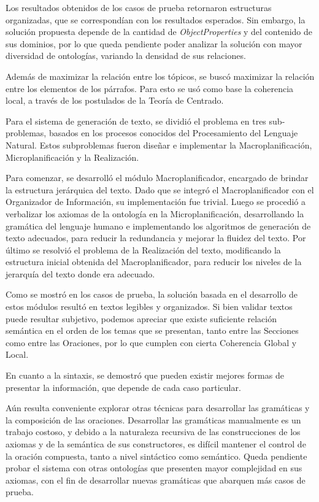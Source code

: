 Los resultados obtenidos de los casos de prueba retornaron estructuras organizadas, que se correspondían con los resultados esperados. Sin embargo, la solución propuesta depende de la cantidad de \emph{ObjectProperties} y del contenido de sus dominios, por lo que queda pendiente poder analizar la solución con mayor diversidad de ontologías, variando la densidad de sus relaciones.

Además de maximizar la relación entre los tópicos, se buscó maximizar la relación entre los elementos de los párrafos. Para esto se usó como base la coherencia local, a través de los postulados de la Teoría de Centrado.

Para el sistema de generación de texto, se dividió el problema en tres sub-problemas, basados en los procesos conocidos del Procesamiento del Lenguaje Natural. Estos subproblemas fueron diseñar e implementar la Macroplanificación, Microplanificación y la Realización. 

Para comenzar, se desarrolló el módulo Macroplanificador, encargado de brindar la estructura jerárquica del texto. Dado que se integró el Macroplanificador con el Organizador de Información, su implementación fue trivial.
Luego se procedió a verbalizar los axiomas de la ontología en la Microplanificación, desarrollando la gramática del lenguaje humano e implementando los algoritmos de generación de texto adecuados, para reducir la redundancia y mejorar la fluidez del texto.
Por  último  se  resolvió  el  problema  de  la  Realización  del  texto,  modificando  la  estructura inicial obtenida del Macroplanificador, para reducir los niveles de la jerarquía del texto donde era adecuado.

Como se mostró en los casos de prueba, la solución basada en el desarrollo de estos módulos resultó en textos legibles y organizados. Si bien validar textos puede resultar subjetivo, podemos apreciar que existe suficiente relación semántica en el orden de los temas que se presentan, tanto entre las Secciones como entre las Oraciones, por lo que cumplen con cierta Coherencia Global y Local.

En cuanto a la sintaxis, se demostró que pueden existir mejores formas de presentar la información, que depende de cada caso particular.

Aún resulta conveniente explorar otras técnicas para desarrollar las gramáticas y la composición de las oraciones. Desarrollar las gramáticas manualmente es un trabajo costoso, y debido a la naturaleza recursiva de las construcciones de los axiomas y de la semántica de sus constructores, es difícil mantener el control de la oración compuesta, tanto a nivel sintáctico como semántico. Queda pendiente probar el sistema con otras ontologías que presenten mayor complejidad en sus axiomas, con el fin de desarrollar nuevas gramáticas que abarquen más casos de prueba.

